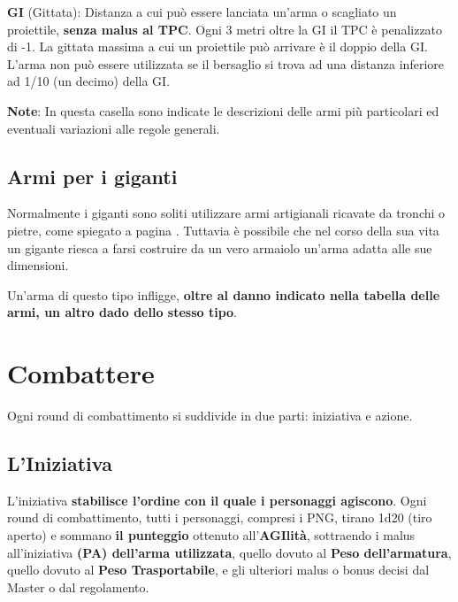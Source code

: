 \begin{description}
\item{\bf GI} (Gittata): Distanza a cui pu\`o essere lanciata
  un'arma o scagliato un proiettile, \textbf{senza malus al TPC}.
  Ogni 3 metri oltre la GI il TPC \`e penalizzato di -1. La gittata
  massima a cui un proiettile pu\`o arrivare \`e il doppio della
  GI.  L'arma non pu\`o essere utilizzata se il bersaglio si trova
  ad una distanza inferiore ad 1/10 (un decimo) della GI.

\item{\bf Note}:
  In questa casella sono indicate le descrizioni delle armi pi\`u
  particolari ed eventuali variazioni alle regole generali.
\end{description}



\subsection{Armi per i giganti} 

Normalmente i giganti sono soliti utilizzare armi artigianali ricavate
da tronchi o pietre, come spiegato a pagina \pageref{armigiganti}.
Tuttavia \`e possibile che nel corso della sua vita un gigante
riesca a farsi costruire da un vero armaiolo un'arma adatta alle sue
dimensioni. 

Un'arma di questo tipo infligge, \textbf{oltre al danno indicato nella
  tabella delle armi, un altro dado dello stesso tipo}. 

\goodbreak
{}

\clearpage\onecolumn\twocolumn
\fi

\section{Combattere}

Ogni round di combattimento si suddivide in due parti: iniziativa e
azione.

\subsection{L'Iniziativa}

L'iniziativa \textbf{stabilisce l'ordine con il quale i personaggi
  agiscono}.  Ogni round di combattimento, tutti i personaggi, compresi i
PNG, tirano 1d20 (tiro aperto) e sommano \textbf{il punteggio} ottenuto
all'\textbf{AGIlit\`a}, sottraendo i malus all'iniziativa
\textbf{(PA) dell'arma utilizzata}, quello dovuto al \textbf{Peso
  dell'armatura}, quello dovuto al \textbf{Peso Trasportabile}, e gli
ulteriori malus o bonus decisi dal Master o dal regolamento.

